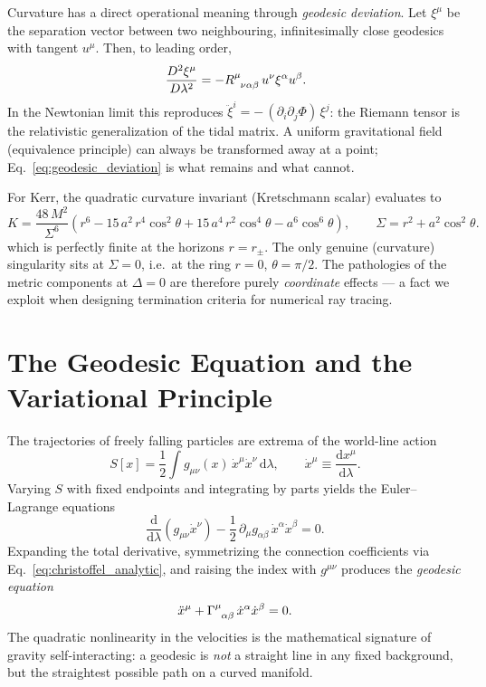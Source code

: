 \documentclass[11pt]{book}
\begin{document}
Curvature has a direct operational meaning through \emph{geodesic deviation}. Let
 $\xi^\mu$ be the separation vector between two neighbouring, infinitesimally close
geodesics with tangent $u^\mu$. Then, to leading order,
\begin{equation}\label{eq:geodesic_deviation}
    \frac{D^2 \xi^\mu}{D\lambda^2} = - \tensor{R}{^\mu_{\nu\alpha\beta}}\,
    u^\nu \xi^\alpha u^\beta .
\end{equation}
In the Newtonian limit this reproduces $\ddot{\xi}^i = -\,(\partial_i\partial_j \Phi)\,
\xi^j$: the Riemann tensor is the relativistic generalization of the tidal matrix. A
uniform gravitational field (equivalence principle) can always be transformed away at a
point; Eq.~\eqref{eq:geodesic_deviation} is what remains and what cannot.

For Kerr, the quadratic curvature invariant (Kretschmann scalar) evaluates to
\begin{equation}\label{eq:kretschmann}
	K = \frac{48\, M^2}{\Sigma^6} \left( r^6 - 15\, a^2\, r^4 \cos^2\theta + 15\, a^4\, r^2 \cos^4\theta - a^6 \cos^6\theta \right), \qquad \Sigma = r^2 + a^2 \cos^2\theta.
\end{equation}
which is perfectly finite at the horizons $r = r_\pm$. The only genuine (curvature)
singularity sits at $\Sigma = 0$, i.e.\ at the ring $r = 0$, $\theta = \pi/2$. The
pathologies of the metric components at $\Delta = 0$ are therefore purely
\emph{coordinate} effects --- a fact we exploit when designing termination criteria for
numerical ray tracing.

\section{The Geodesic Equation and the Variational Principle}

The trajectories of freely falling particles are extrema of the world-line action
\begin{equation}
    S[x] = \frac{1}{2}\int g_{\mu\nu}(x)\, \dot{x}^\mu \dot{x}^\nu \,\mathrm{d}\lambda,
    \qquad \dot{x}^\mu \equiv \frac{\mathrm{d}x^\mu}{\mathrm{d}\lambda}.
\end{equation}
Varying $S$ with fixed endpoints and integrating by parts yields the Euler--Lagrange
equations
\begin{equation}
    \frac{\mathrm{d}}{\mathrm{d}\lambda}\left(g_{\mu\nu}\dot{x}^\nu\right)
    - \frac{1}{2}\,\partial_\mu g_{\alpha\beta}\, \dot{x}^\alpha \dot{x}^\beta = 0 .
\end{equation}
Expanding the total derivative, symmetrizing the connection coefficients via
Eq.~\eqref{eq:christoffel_analytic}, and raising the index with $g^{\mu\nu}$ produces the
\emph{geodesic equation}
\begin{equation}\label{eq:geodesic}
    \ddot{x}^\mu + \tensor{\Gamma}{^\mu_{\alpha\beta}}\, \dot{x}^\alpha \dot{x}^\beta = 0 .
\end{equation}
The quadratic nonlinearity in the velocities is the mathematical signature of gravity
self-interacting: a geodesic is \emph{not} a straight line in any fixed background, but
the straightest possible path on a curved manifold.
\end{document}
